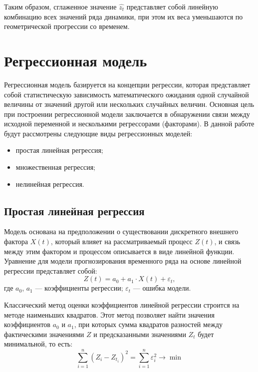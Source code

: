 Таким образом, сглаженное значение $\hat{z_t}$ представляет собой линейную комбинацию всех значений ряда динамики,
при этом их веса уменьшаются по геометрической прогрессии со временем.

\section{Регрессионная модель}

Регрессионная модель базируется на концепции регрессии, которая представляет собой статистическую зависимость
математического ожидания одной случайной величины от значений другой или нескольких случайных величин.
Основная цель при построении регрессионной модели заключается в обнаружении связи между исходной переменной и несколькими регрессорами (факторами).
В данной работе будут рассмотрены следующие виды регрессионных моделей:
\begin{itemize}[label*=---]
    \item простая линейная регрессия;
    \item множественная регрессия;
    \item нелинейная регрессия.
\end{itemize}

\subsection{Простая линейная регрессия}

Модель основана на предположении о существовании дискретного внешнего фактора $X(t)$, который влияет на рассматриваемый процесс $Z(t)$, и связь между этим фактором и процессом описывается в виде линейной функции. Уравнение для модели прогнозирования временного ряда на основе линейной регрессии представляет собой:
\begin{equation}
    Z(t) = a_0 + a_1 \cdot X(t) + \varepsilon_t,
\end{equation}
где $a_0$, $a_1$ --- коэффициенты регрессии; $\varepsilon_t$ --- ошибка модели.

Классический метод оценки коэффициентов линейной регрессии строится на методе наименьших квадратов.
Этот метод позволяет найти значения коэффициентов $a_0$ и $a_1$, при которых сумма квадратов разностей между фактическими значениями $Z$ и предсказанными значениями $Z_t$ будет минимальной, то есть:
\begin{equation}
    \sum_{i = 1}^{n}(Z_i - Z_{t_i})^2 = \sum_{i = 1}^{n}\varepsilon_i^2 \rightarrow \min
\end{equation}

